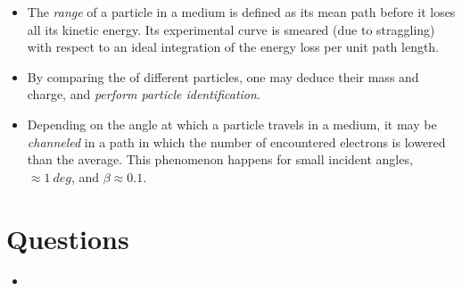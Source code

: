 \begin{itemize}
    \item The \emph{range} of a particle in a medium is defined as its mean path before it loses all its kinetic energy. Its experimental curve is smeared (due to straggling) with respect to an ideal integration of the energy loss per unit path length.
    \item By comparing the  of different particles, one may deduce their mass and charge, and \emph{perform particle identification}.
    \item Depending on the angle at which a particle travels in a medium, it may be \emph{channeled} in a path in which the number of encountered electrons is lowered than the average. This phenomenon happens for small incident angles, $\approx \SI{1}{deg}$, and $\beta\approx0.1$.
\end{itemize}
\section*{Questions}
\begin{itemize}
    \item 
\end{itemize}